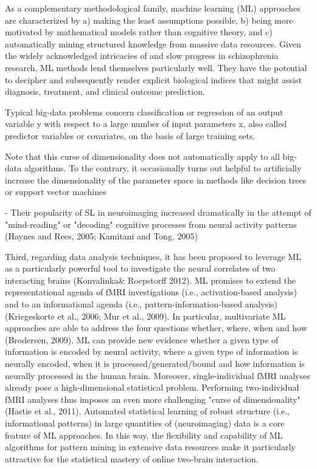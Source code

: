 \documentclass[authoryear,review,3p]{elsarticle}
\begin{document}
As a complementary methodological family, machine learning (ML) approaches are characterized by a) making the least assumptions possible, b) being more motivated by mathematical models rather than cognitive theory, and c) automatically mining structured knowledge from massive data resources. Given the widely acknowledged intricacies of and slow progress in schizophrenia research, ML methods lend themselves particularly well. They have the potential to decipher and subsequently render explicit biological indices that might assist diagnosis, treatment, and clinical outcome prediction.


Typical big-data problems concern classification or regression of an output variable y with respect to a large number of input parameters x, also called predictor variables or covariates, on the basis of large training sets. 


Note that this curse of dimensionality does not automatically apply to all big-data algorithms. To the contrary, it occasionally turns out helpful to artificially increase the dimensionality of the parameter space in methods like decision trees or support vector machines 

- Their popularity of SL in neuroimaging increased dramatically in the attempt of "mind-reading" or "decoding" cognitive processes from neural activity patterns (Haynes and Rees, 2005; Kamitani and Tong, 2005)


Third, regarding data analysis techniques, it has been proposed to leverage ML as a particularly powerful tool to investigate the neural correlates of two interacting brains (Konvalinka\& Roepstorff 2012). ML promises to extend the representational agenda of fMRI investigations (i.e., activation-based analysis) and to an informational agenda (i.e., pattern-information-based analysis) (Kriegeskorte et al., 2006; Mur et al., 2009). In particular, multivariate ML approaches are able to address the four questions whether, where, when and how (Brodersen, 2009). ML can provide new evidence whether a given type of information is encoded by neural activity, where a given type of information is neurally encoded, when it is processed/generated/bound and how information is neurally processed in the human brain. Moreover, single-individual fMRI analyses already pose a high-dimensional statistical problem. Performing two-individual fMRI analyses thus imposes an even more challenging "curse of dimensionality" (Hastie et al., 2011). Automated statistical learning of robust structure (i.e., informational patterns) in large quantities of (neuroimaging) data is a core feature of ML approaches. In this way, the flexibility and capability of ML algorithms for pattern mining in extensive data resources make it particularly attractive for the statistical mastery of online two-brain interaction.
\end{document}

